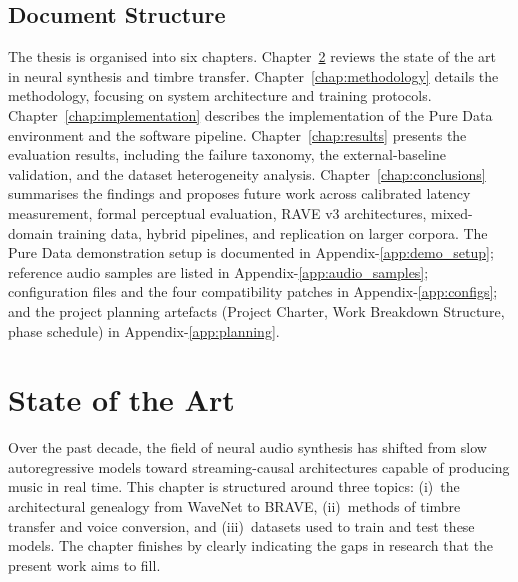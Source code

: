 \documentclass[a4paper,11pt,oneside,openany]{book}
\begin{document}
\section{Document Structure}\label{sec:doc_structure}

The thesis is organised into six chapters. Chapter~\ref{chap:sota} reviews the state of the art in neural synthesis and timbre transfer. Chapter~\ref{chap:methodology} details the methodology, focusing on system architecture and training protocols. Chapter~\ref{chap:implementation} describes the implementation of the Pure Data environment and the software pipeline. Chapter~\ref{chap:results} presents the evaluation results, including the failure taxonomy, the external-baseline validation, and the dataset heterogeneity analysis. Chapter~\ref{chap:conclusions} summarises the findings and proposes future work across calibrated latency measurement, formal perceptual evaluation, RAVE v3 architectures, mixed-domain training data, hybrid pipelines, and replication on larger corpora. The Pure Data demonstration setup is documented in Appendix-\ref{app:demo_setup}; reference audio samples are listed in Appendix-\ref{app:audio_samples}; configuration files and the four compatibility patches in Appendix-\ref{app:configs}; and the project planning artefacts (Project Charter, Work Breakdown Structure, phase schedule) in Appendix-\ref{app:planning}.

\chapter{State of the Art}\label{chap:sota}

Over the past decade, the field of neural audio synthesis has shifted from slow autoregressive models toward streaming-causal architectures capable of producing music in real time. This chapter is structured around three topics: (i)~the architectural genealogy from WaveNet to BRAVE, (ii)~methods of timbre transfer and voice conversion, and (iii)~datasets used to train and test these models. The chapter finishes by clearly indicating the gaps in research that the present work aims to fill.
\end{document}
